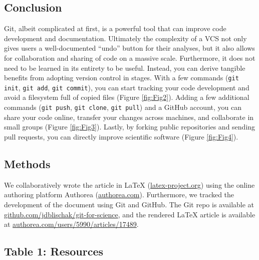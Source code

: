 \documentclass[10pt]{article}
\begin{document}
\subsection{Conclusion}

Git, albeit complicated at first, is a powerful tool that can improve code development and documentation.
Ultimately the complexity of a VCS not only gives users a well-documented ``undo'' button for their analyses, but it also allows for collaboration and sharing of code on a massive scale.
Furthermore, it does not need to be learned in its entirety to be useful.
Instead, you can derive tangible benefits from adopting version control in stages.
With a few commands (\verb|git init|, \verb|git add|, \verb|git commit|), you can start tracking your code development and avoid a filesystem full of copied files (Figure \ref{fig:Fig2}).
Adding a few additional commands (\verb|git push|, \verb|git clone|, \verb|git pull|) and a GitHub account, you can share your code online, transfer your changes across machines, and collaborate in small groups (Figure \ref{fig:Fig3}).
Lastly, by forking public repositories and sending pull requests, you can directly improve scientific software (Figure \ref{fig:Fig4}).


\subsection{Methods}

We collaboratively wrote the article in LaTeX (\href{http://www.latex-project.org/}{latex-project.org}) using the online authoring platform Authorea (\href{https://www.authorea.com}{authorea.com}).
Furthermore, we tracked the development of the document using Git and GitHub.
The Git repo is available at \href{https://github.com/jdblischak/git-for-science}{github.com/jdblischak/git-for-science}, and the rendered LaTeX article is available at \href{https://www.authorea.com/users/5990/articles/17489}{authorea.com/users/5990/articles/17489}.

\subsection{Table 1: Resources}
\end{document}
